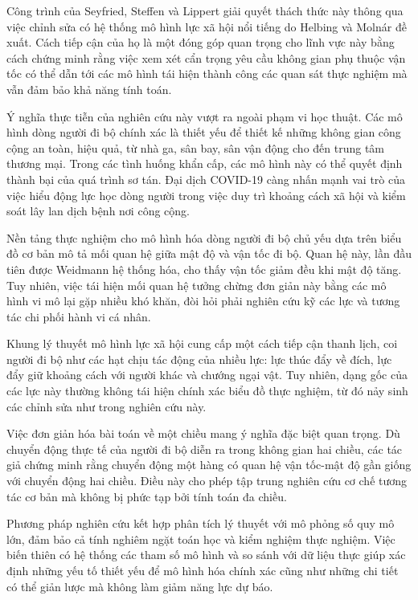 \documentclass[12pt,a4paper]{article}
\begin{document}
Công trình của Seyfried, Steffen và Lippert giải quyết thách thức này thông qua việc chỉnh sửa có hệ thống mô hình lực xã hội nổi tiếng do Helbing và Molnár đề xuất. Cách tiếp cận của họ là một đóng góp quan trọng cho lĩnh vực này bằng cách chứng minh rằng việc xem xét cẩn trọng yêu cầu không gian phụ thuộc vận tốc có thể dẫn tới các mô hình tái hiện thành công các quan sát thực nghiệm mà vẫn đảm bảo khả năng tính toán.

Ý nghĩa thực tiễn của nghiên cứu này vượt ra ngoài phạm vi học thuật. Các mô hình dòng người đi bộ chính xác là thiết yếu để thiết kế những không gian công cộng an toàn, hiệu quả, từ nhà ga, sân bay, sân vận động cho đến trung tâm thương mại. Trong các tình huống khẩn cấp, các mô hình này có thể quyết định thành bại của quá trình sơ tán. Đại dịch COVID-19 càng nhấn mạnh vai trò của việc hiểu động lực học dòng người trong việc duy trì khoảng cách xã hội và kiểm soát lây lan dịch bệnh nơi công cộng.

Nền tảng thực nghiệm cho mô hình hóa dòng người đi bộ chủ yếu dựa trên biểu đồ cơ bản mô tả mối quan hệ giữa mật độ và vận tốc đi bộ. Quan hệ này, lần đầu tiên được Weidmann hệ thống hóa, cho thấy vận tốc giảm đều khi mật độ tăng. Tuy nhiên, việc tái hiện mối quan hệ tưởng chừng đơn giản này bằng các mô hình vi mô lại gặp nhiều khó khăn, đòi hỏi phải nghiên cứu kỹ các lực và tương tác chi phối hành vi cá nhân.

Khung lý thuyết mô hình lực xã hội cung cấp một cách tiếp cận thanh lịch, coi người đi bộ như các hạt chịu tác động của nhiều lực: lực thúc đẩy về đích, lực đẩy giữ khoảng cách với người khác và chướng ngại vật. Tuy nhiên, dạng gốc của các lực này thường không tái hiện chính xác biểu đồ thực nghiệm, từ đó nảy sinh các chỉnh sửa như trong nghiên cứu này.

Việc đơn giản hóa bài toán về một chiều mang ý nghĩa đặc biệt quan trọng. Dù chuyển động thực tế của người đi bộ diễn ra trong không gian hai chiều, các tác giả chứng minh rằng chuyển động một hàng có quan hệ vận tốc-mật độ gần giống với chuyển động hai chiều. Điều này cho phép tập trung nghiên cứu cơ chế tương tác cơ bản mà không bị phức tạp bởi tính toán đa chiều.

Phương pháp nghiên cứu kết hợp phân tích lý thuyết với mô phỏng số quy mô lớn, đảm bảo cả tính nghiêm ngặt toán học và kiểm nghiệm thực nghiệm. Việc biến thiên có hệ thống các tham số mô hình và so sánh với dữ liệu thực giúp xác định những yếu tố thiết yếu để mô hình hóa chính xác cũng như những chi tiết có thể giản lược mà không làm giảm năng lực dự báo.
\end{document}
